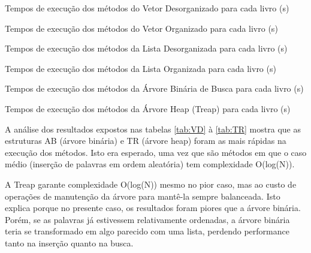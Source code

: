 \documentclass[a4paper]{article}
\begin{document}
\begin{landscape}

  \begin{table}[H]
    \centering
    \caption{Tempos de execução dos métodos do Vetor Desorganizado para cada livro (s)}
    \label{tab:VD}
    \footnotesize
    
    
  \end{table}
  
  \begin{table}[H]
    \centering
    \caption{Tempos de execução dos métodos do Vetor Organizado para cada livro (s)}
    \label{tab:VO}
    \footnotesize
    
  \end{table}
  
  \begin{table}[H]
    \centering
    \caption{Tempos de execução dos métodos da Lista Desorganizada para cada livro (s)}
    \label{tab:LD}
    \footnotesize
    
  \end{table}
  
  \begin{table}[H]
    \centering
    \caption{Tempos de execução dos métodos da Lista Organizada para cada livro (s)}
    \label{tab:LO}
    \footnotesize
    
  \end{table}
  
  \begin{table}[H]
    \centering
    \caption{Tempos de execução dos métodos da Árvore Binária de Busca para cada livro (s)}
    \label{tab:AB}
    \footnotesize
    
  \end{table}
  
  \begin{table}[H]
    \centering
    \caption{Tempos de execução dos métodos da Árvore Heap (Treap) para cada livro (s)}
    \label{tab:TR}
    \footnotesize
    
  \end{table}
  
\end{landscape}

A análise dos resultados expostos nas tabelas \ref{tab:VD} à \ref{tab:TR} mostra que as estruturas AB (árvore binária) e TR (árvore heap) foram as mais rápidas na execução dos métodos. Isto era esperado, uma vez que são métodos em que o caso médio (inserção de palavras em ordem aleatória) tem complexidade O(log(N)).

A Treap garante complexidade O(log(N)) mesmo no pior caso, mas ao custo de operações de manutenção da árvore para mantê-la sempre balanceada. Isto explica porque no presente caso, os resultados foram piores que a árvore binária. Porém, se as palavras já estivessem relativamente ordenadas, a árvore binária teria se transformado em algo parecido com uma lista, perdendo performance tanto na inserção quanto na busca.
\end{document}
